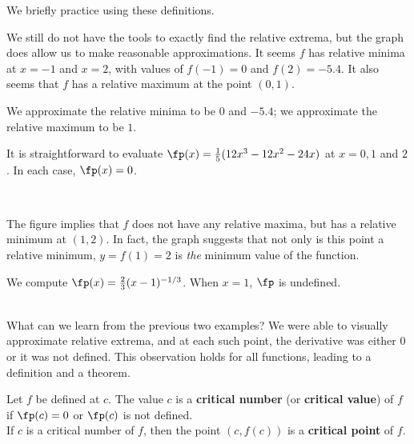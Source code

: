 \restoreboxwidth

We briefly practice using these definitions.\\

{We still do not have the tools to exactly find the relative extrema, but the graph does allow us to make reasonable approximations. It seems $f$ has relative minima at $x=-1$ and $x=2$, with values of $f(-1)=0$ and $f(2) = -5.4$. It also seems that $f$ has a relative maximum at the point $(0,1)$. 

We approximate the relative minima to be $0$ and $-5.4$; we approximate the relative maximum to be $1$.

It is straightforward to evaluate $\fp(x) =\frac15(12x^3-12x^2-24x)$ at $x=0, 1$ and $2$. In each case, $\fp(x) = 0$. 
}\\

{The figure implies that $f$ does not have any relative maxima, but has a relative minimum at $(1,2)$. In fact, the graph suggests that not only is this point a relative minimum, $y=f(1)=2$ is \textit{the} minimum value of the function.

We compute $\fp(x) = \frac23(x-1)^{-1/3}$. When $x=1$, $\fp$ is undefined.}\\

What can we learn from the previous two examples? We were able to visually approximate relative extrema, and at each such point, the derivative was either 0 or it was not defined. This observation holds for all functions, leading to a definition and a theorem.

%
{Let $f$ be defined at $c$. The value $c$ is a \textbf{critical number} (or \textbf{critical value}) of $f$ if $\fp(c)=0$ or $\fp(c)$ is not defined. \\

If $c$ is a critical number of $f$, then the point $(c,f(c))$ is a \textbf{critical point} of $f$.
}

